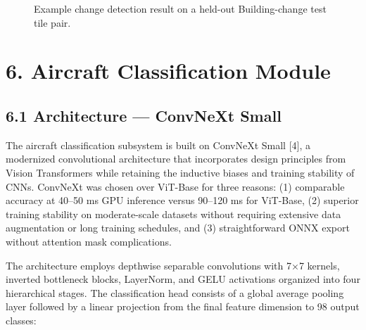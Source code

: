 \documentclass[11pt,a4paper]{article}
\begin{document}
\begin{figure}[htbp]
\centering
{}
\caption{Example change detection result on a held-out Building-change test tile pair.}
\label{fig:change-example}
\end{figure}

\hypertarget{aircraft-classification-module}{%
\section{6. Aircraft Classification Module}\label{aircraft-classification-module}}

\hypertarget{architecture-convnext-small}{%
\subsection{6.1 Architecture --- ConvNeXt Small}\label{architecture-convnext-small}}

The aircraft classification subsystem is built on ConvNeXt Small [4], a modernized convolutional architecture that incorporates design principles from Vision Transformers while retaining the inductive biases and training stability of CNNs. ConvNeXt was chosen over ViT-Base for three reasons: (1) comparable accuracy at 40--50 ms GPU inference versus 90--120 ms for ViT-Base, (2) superior training stability on moderate-scale datasets without requiring extensive data augmentation or long training schedules, and (3) straightforward ONNX export without attention mask complications.

The architecture employs depthwise separable convolutions with 7×7 kernels, inverted bottleneck blocks, LayerNorm, and GELU activations organized into four hierarchical stages. The classification head consists of a global average pooling layer followed by a linear projection from the final feature dimension to 98 output classes:
\end{document}
